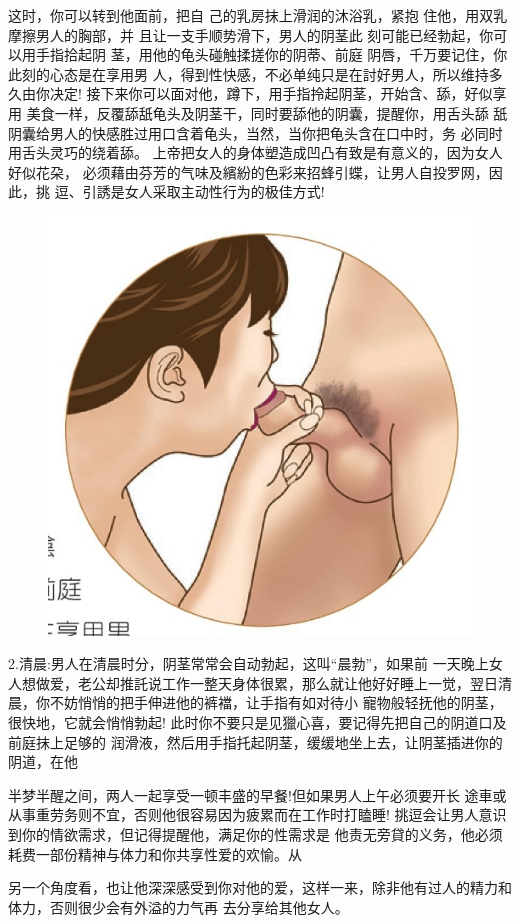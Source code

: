 \documentclass[12pt,UTF8]{ctexbook}
\begin{document}
这时，你可以转到他面前，把自
己的乳房抹上滑润的沐浴乳，紧抱
住他，用双乳摩擦男人的胸部，并
且让一支手顺势滑下，男人的阴茎此
刻可能已经勃起，你可以用手指拾起阴
茎，用他的龟头碰触揉搓你的阴蒂、前庭
阴唇，千万要记住，你此刻的心态是在享用男
人，得到性快感，不必单纯只是在討好男人，所以维持多久由你决定!
接下来你可以面对他，蹲下，用手指拎起阴茎，开始含、舔，好似享用
美食一样，反覆舔舐龟头及阴茎干，同时要舔他的阴囊，提醒你，用舌头舔
舐阴囊给男人的快感胜过用口含着龟头，当然，当你把龟头含在口中时，务
必同时用舌头灵巧的绕着舔。
上帝把女人的身体塑造成凹凸有致是有意义的，因为女人好似花朶，
必须藉由芬芳的气味及繽紛的色彩来招蜂引蝶，让男人自投罗网，因此，挑
逗、引誘是女人采取主动性行为的极佳方式!

\begin{figure}[htbp]
	\centering
	\includegraphics[width=0.7\linewidth]{15}
	\caption{}
	\label{fig:1}
\end{figure}

2.清晨:男人在清晨时分，阴茎常常会自动勃起，这叫“晨勃”，如果前
一天晚上女人想做爱，老公却推託说工作一整天身体很累，那么就让他好好睡上一觉，翌日清晨，你不妨悄悄的把手伸进他的裤襠，让手指有如对待小
寵物般轻抚他的阴茎，很快地，它就会悄悄勃起!
此时你不要只是见獵心喜，要记得先把自己的阴道口及前庭抹上足够的
润滑液，然后用手指托起阴茎，缓缓地坐上去，让阴茎插进你的阴道，在他

半梦半醒之间，两人一起享受一顿丰盛的早餐!但如果男人上午必须要开长
途車或从事重劳务则不宜，否则他很容易因为疲累而在工作时打瞌睡!
挑逗会让男人意识到你的情欲需求，但记得提醒他，满足你的性需求是
他责无旁貸的义务，他必须耗费一部份精神与体力和你共享性爱的欢愉。从

另一个角度看，也让他深深感受到你对他的爱，这样一来，除非他有过人的精力和体力，否则很少会有外溢的力气再
去分享给其他女人。
\end{document}
